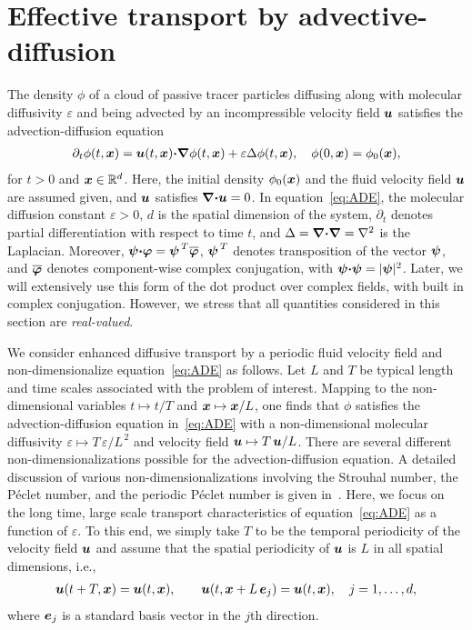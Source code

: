 \documentclass[amsa]{ipart}
\begin{document}
\section{Effective transport by
  advective-diffusion} \label{sec:Eff_Trans}    
%
The density $\phi$ of a cloud of passive tracer particles diffusing along
with molecular diffusivity $\varepsilon$ and being advected by an incompressible
velocity field $\boldsymbol{u}$ satisfies the advection-diffusion equation
%
\begin{align}\label{eq:ADE}
  \partial_t\phi(t,\vecx)
    =\vecu (t,\vecx)\bcdot\bnabla \phi(t,\vecx)+\varepsilon\Delta \phi(t,\vecx),
  \quad
  \phi(0,\vecx)=\phi_0(\vecx),  
\end{align}
%
for $t>0$ and $\boldsymbol{x}\in\mathbb{R}^d$.
Here, the initial density $\phi_0(\boldsymbol{x})$ and the fluid velocity field
$\boldsymbol{u}$ are assumed given, and $\boldsymbol{u}$ satisfies $\mbox{\boldmath${\nabla}$}\mbox{\boldmath${\cdot}$}\boldsymbol{u}=0$.
In equation~\eqref{eq:ADE}, the molecular diffusion constant $\varepsilon>0$,
$d$ is the spatial dimension of the 
system, $\partial_t$ denotes partial differentiation with respect to time
$t$, and $\Delta=\mbox{\boldmath${\nabla}$}\mbox{\boldmath${\cdot}$}\mbox{\boldmath${\nabla}$} =\nabla^2$ is the Laplacian. Moreover, 
$\boldsymbol{\psi}\mbox{\boldmath${\cdot}$}\boldsymbol{\varphi}=\boldsymbol{\psi}^{\,T}\overline{\boldsymbol{\varphi}}$,
$\boldsymbol{\psi}^{\,T}$ denotes transposition of the vector $\boldsymbol{\psi}$, and
$\overline{\boldsymbol{\varphi}}$ denotes component-wise complex conjugation,
with $\boldsymbol{\psi}\mbox{\boldmath${\cdot}$}\boldsymbol{\psi}=|\boldsymbol{\psi}|^2$. Later, we will extensively use this
form of the dot product over complex fields, with built in complex
conjugation. However, we stress that 
all quantities considered in this section are \emph{real-valued}.




We consider enhanced diffusive transport by a periodic fluid velocity
field and non-dimensionalize equation~\eqref{eq:ADE} as follows. Let
$L$ and $T$ be typical length and time scales associated with the
problem of interest. Mapping to the non-dimensional variables
$t\mapsto t/T$ and $\boldsymbol{x}\mapsto \boldsymbol{x}/L$,
one finds that $\phi$ satisfies the advection-diffusion equation
in~\eqref{eq:ADE} with a non-dimensional molecular diffusivity 
$\varepsilon\mapsto T\,\varepsilon/L^{\,2}$ and velocity field $\boldsymbol{u}\mapsto T\,\boldsymbol{u} /L$. There are
several different non-dimensionalizations possible 
for the advection-diffusion equation. A detailed discussion of 
various non-dimensionalizations involving the Strouhal number, the
P{\'e}clet number, and the periodic P{\'e}clet number is given
in~\cite{McLaughlin:Forest:PF:1999:880,Majda:Kramer:1999:book}.  Here,
we focus on the long time, large scale transport characteristics of
equation~\eqref{eq:ADE} as a function of $\varepsilon$. To this end, we simply
take $T$ to be the temporal periodicity of the velocity field $\boldsymbol{u}$
and assume that the spatial periodicity of $\boldsymbol{u}$ is $L$ in all
spatial dimensions, i.e., 
%
\begin{align}\label{eq:Periodic_u}
  \vecu(t+T,\vecx)=\vecu(t,\vecx), \qquad
  \vecu(t,\vecx+L\,\vece_j)=\vecu(t,\vecx), \quad
  j=1,\ldots,d,
\end{align}
%
where $\boldsymbol{e}_j$ is a standard basis vector in the $j$th direction. 
\end{document}
